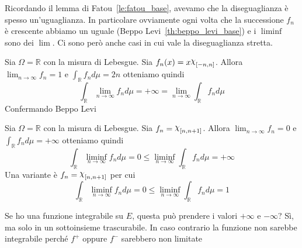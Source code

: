 Ricordando il lemma di Fatou~\ref{le:fatou_base}, avevamo che la diseguaglianza
è spesso un'uguaglianza. In particolare ovviamente ogni volta che la successione
\(f_{n}\) è crescente abbiamo un uguale (Beppo Levi~\ref{th:beppo_levi_base}) e
i \(\liminf \)  sono dei \(\lim\). Ci sono però anche casi in cui vale la
diseguaglianza stretta.

\begin{example}
    Sia \(\Omega = \mathbb{R}\) con la misura di Lebesgue. Sia \(f_{n}{(x)} =
    x\rchi_{[-n, n]}\). Allora \(\lim_{n \to \infty} f_{n} = 1\) e
    \(\int_{\mathbb{R}} f_{n} d\mu = 2n\) otteniamo quindi
    \[
        \int_{\mathbb{R}} \lim_{n \to \infty} f_{n} d\mu = +\infty =
        \lim_{n \to \infty} \int_{\mathbb{R}} f_{n} d\mu
    \]
    Confermando Beppo Levi
\end{example}
\begin{example}\label{ex:limite_integrale_NO}
    Sia \(\Omega = \mathbb{R}\) con la misura di Lebesgue. Sia \(f_{n} =
    \rchi_{[n, n+1]}\). Allora \(\lim_{n \to \infty} f_{n} = 0\) e
    \(\int_{\mathbb{R}} f_{n} d\mu = +\infty\) otteniamo quindi 
    \[
        \int_{\mathbb{R}} \liminf_{n \to \infty} f_{n} d\mu = 0 \le \liminf_{n
        \to \infty} \int_{\mathbb{R}} f_{n} d\mu = +\infty
    \]
    Una variante è \(f_{n} = \rchi_{[n, n+1]}\) per cui
    \[
        \int_{\mathbb{R}} \liminf_{n \to \infty} f_{n} d\mu = 0 \le \liminf_{n
        \to \infty} \int_{\mathbb{R}} f_{n} d\mu = 1
    \]
\end{example}

Se ho una funzione integrabile su \(E\), questa può prendere i valori
\(+\infty\) e \(-\infty\)? Sì, ma solo in un sottoinsieme trascurabile. In caso
contrario la funzione non sarebbe integrabile perché \(f^{+}\) oppure \(f^{-}\)
sarebbero non limitate

